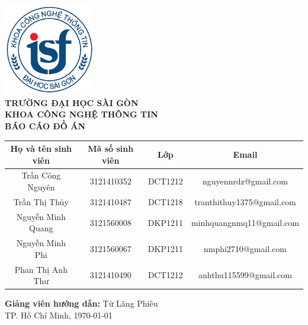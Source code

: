 \documentclass[a4paper,12pt]{report}
\begin{document}
\begin{titlepage}
    \thispagestyle{empty} %
    \centering
    \includegraphics[width=4cm]{latex/imgs/logoITSGU.png} \\[1cm]
    \textbf{\Large TRƯỜNG ĐẠI HỌC SÀI GÒN} \\[0.5cm]
    \textbf{\Large KHOA CÔNG NGHỆ THÔNG TIN} \\[2cm]
    {\Huge \textbf{BÁO CÁO ĐỒ ÁN}} \\[2cm]
    \begin{center}
        \begin{tabular}{|c|c|c|c|}
            \hline
            \textbf{Họ và tên sinh viên} & \textbf{Mã số sinh viên} & \textbf{Lớp} & \textbf{Email} \\
            \hline
            Trần Công Nguyên & 3121410352 & DCT1212 & nguyennrdz@gmail.com \\
            \hline
            Trần Thị Thủy & 3121410487 & DCT1218 & tranthithuy1375@gmail.com \\
            \hline
            Nguyễn Minh Quang & 3121560008 & DKP1211 & minhquangnmq11@gmail.com \\
            \hline
            Nguyễn Minh Phi & 3121560067 & DKP1211 & nmphi2710@gmail.com \\
            \hline
            Phan Thị Anh Thư & 3121410490 & DCT1212 & anhthu115599@gmail.com \\
            \hline
        \end{tabular}
        
    \end{center}
    
    \vspace{1cm}
    \textbf{Giảng viên hướng dẫn:} Từ Lãng Phiêu \\
    \vfill
    TP. Hồ Chí Minh, \today
\end{titlepage}

\tableofcontents
\cleardoublepage








\end{document}
